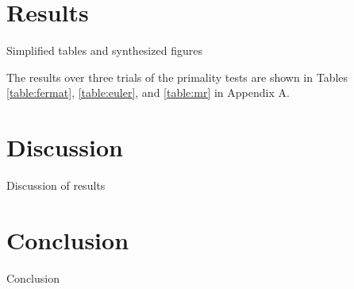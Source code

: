 \documentclass{article}
\begin{document}
\section{Results}
Simplified tables and synthesized figures

The results over three trials of the primality tests are shown in Tables \ref{table:fermat}, \ref{table:euler}, and \ref{table:mr} in Appendix A.

\section{Discussion}
Discussion of results

\section{Conclusion}
Conclusion

\nocite{*}


\end{document}
